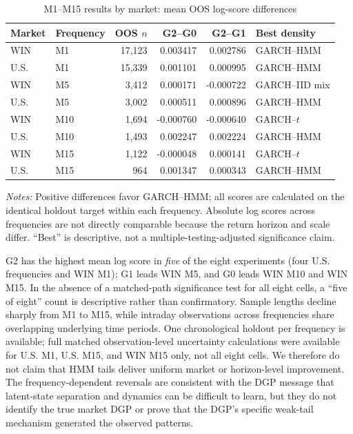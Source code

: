 \documentclass[11pt,a4paper]{article}
\begin{document}
\begin{table}[htbp]\centering\small
\caption{M1--M15 results by market: mean OOS log-score differences}\label{tab:intraday8}
\setlength{\tabcolsep}{5pt}
\begin{tabular}{llrrrl}\toprule
Market & Frequency & OOS $n$ & G2--G0 & G2--G1 & Best density \\\midrule
WIN & M1 & 17,123 & 0.003417 & 0.002786 & GARCH--HMM \\ 
U.S. & M1 & 15,339 & 0.001101 & 0.000995 & GARCH--HMM \\ 
WIN & M5 & 3,412 & 0.000171 & -0.000722 & GARCH--IID mix \\ 
U.S. & M5 & 3,002 & 0.000511 & 0.000896 & GARCH--HMM \\ 
WIN & M10 & 1,694 & -0.000760 & -0.000640 & GARCH--$t$ \\ 
U.S. & M10 & 1,493 & 0.002247 & 0.002224 & GARCH--HMM \\ 
WIN & M15 & 1,122 & -0.000048 & 0.000141 & GARCH--$t$ \\ 
U.S. & M15 & 964 & 0.001347 & 0.000343 & GARCH--HMM \\ 
\bottomrule\end{tabular}
\par\vspace{2pt}\footnotesize\emph{Notes:} Positive differences favor GARCH--HMM; all scores are calculated on the identical holdout target within each frequency. Absolute log scores across frequencies are not directly comparable because the return horizon and scale differ. ``Best'' is descriptive, not a multiple-testing-adjusted significance claim.
\end{table}

G2 has the highest mean log score in \emph{five} of the eight experiments (four U.S. frequencies and WIN M1); G1 leads WIN M5, and G0 leads WIN M10 and WIN M15. In the absence of a matched-path significance test for all eight cells, a ``five of eight'' count is descriptive rather than confirmatory. Sample lengths decline sharply from M1 to M15, while intraday observations across frequencies share overlapping underlying time periods. One chronological holdout per frequency is available; full matched observation-level uncertainty calculations were available for U.S. M1, U.S. M15, and WIN M15 only, not all eight cells. We therefore do not claim that HMM tails deliver uniform market or horizon-level improvement. The frequency-dependent reversals are consistent with the DGP message that latent-state separation and dynamics can be difficult to learn, but they do not identify the true market DGP or prove that the DGP's specific weak-tail mechanism generated the observed patterns.
\end{document}
